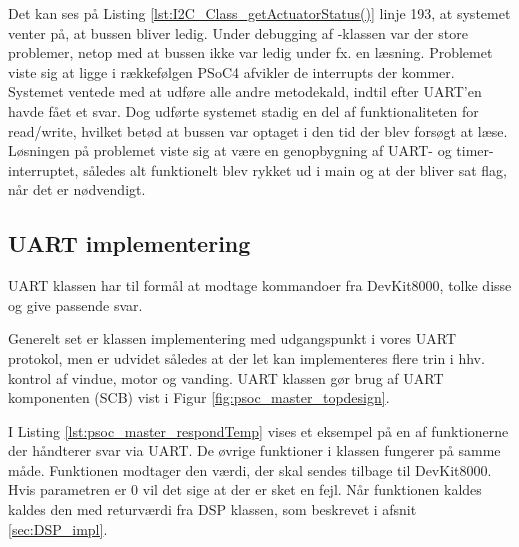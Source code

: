 

Det kan ses på Listing \ref{lst:I2C_Class_getActuatorStatus()} linje 193, at systemet venter på, at bussen bliver ledig. Under debugging af \IIC-klassen var der store problemer, netop med at bussen ikke var ledig under fx. en læsning. 
Problemet viste sig at ligge i rækkefølgen PSoC4 afvikler de interrupts der kommer. 
Systemet ventede med at udføre alle andre metodekald, indtil efter UART'en havde fået et svar. 
Dog udførte systemet stadig en del af funktionaliteten for \IIC read/write, hvilket betød at bussen var optaget i den tid der blev forsøgt at læse. 
Løsningen på problemet viste sig at være en genopbygning af UART- og timer-interruptet, således alt funktionelt blev rykket ud i main og at der bliver sat flag, når det er nødvendigt.

\subsection{UART implementering}
UART klassen har til formål at modtage kommandoer fra DevKit8000, tolke disse og give passende svar. 

Generelt set er klassen implementering med udgangspunkt i vores UART protokol, men er udvidet således at der let kan implementeres flere trin i hhv. kontrol af vindue, motor og vanding. UART klassen gør brug af UART komponenten (SCB) vist i Figur \ref{fig:psoc_master_topdesign}.



I Listing \ref{lst:psoc_master_respondTemp} vises et eksempel på en af funktionerne der håndterer svar via UART. De øvrige funktioner i klassen fungerer på samme måde. Funktionen modtager den værdi, der skal sendes tilbage til DevKit8000. Hvis parametren er 0 vil det sige at der er sket en fejl. Når funktionen kaldes kaldes den med returværdi fra DSP klassen, som beskrevet i afsnit \ref{sec:DSP_impl}.



